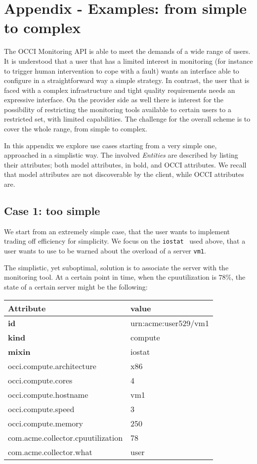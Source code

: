 \documentclass[12pt]{article}  %
\begin{document}
\appendix

\section*{Appendix - Examples: from simple to complex}

The OCCI Monitoring API is able to meet the demands of a wide range of users. It is understood that a user that has a limited interest in monitoring (for instance to trigger human intervention to cope with a fault) wants an interface able to configure in a straightforward way a simple strategy. In contrast, the user that is faced with a complex infrastructure and tight quality requirements needs an expressive interface. On the provider side as well there is interest for the possibility of restricting the monitoring tools available to certain users to a restricted set, with limited capabilities. The challenge for the overall scheme is to cover the whole range, from simple to complex.

In this appendix we explore use cases starting from a very simple one, approached in a simplistic way. The involved {\em Entities} are described by listing their attributes; both model attributes, in bold, and OCCI attributes. We recall that model attributes are not discoverable by the client, while OCCI attributes are.

\subsection*{Case 1: too simple}

We start from an extremely simple case, that the user wants to implement trading off efficiency for simplicity. We focus on the {\tt iostat} \mi\ used above, that a user wants to use to be warned about the overload of a server {\tt \small vm1}.

The simplistic, yet suboptimal, solution is to associate the server with the monitoring tool. At a certain point in time, when the cpuutilization is $78\%$, the state of a certain server might be the following:

{
\small
\begin{tabular}{l|l}
Attribute                         & value \\ \hline
{\bf id}                          & urn:acme:user529/vm1 \\
{\bf kind}                        & compute \\
{\bf mixin}                       & iostat \\
occi.compute.architecture         & x86   \\
occi.compute.cores                & 4     \\ 
occi.compute.hostname             & vm1   \\            
occi.compute.speed                & 3     \\                  
occi.compute.memory               & 250   \\
com.acme.collector.cpuutilization & 78    \\                     
com.acme.collector.what           & user  \\
\end{tabular}
}
\end{document}

